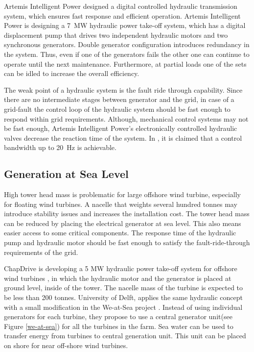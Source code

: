 \documentclass[a4paper, 11pt]{article} %
\begin{document}
Artemis Intelligent Power designed a digital controlled hydraulic transmission system, which ensures fast response and efficient operation. Artemis Intelligent Power is designing a 7~MW hydraulic power take-off system, which has a digital displacement pump that drives two independent hydraulic motors and two synchronous generators. Double generator configuration introduces redundancy in the system. Thus, even if one of the generators fails the other one can continue to operate until the next maintenance. Furthermore, at partial loads one of the sets can be idled to increase the overall efficiency.

The weak point of a hydraulic system is the fault ride through capability. Since there are no intermediate stages between generator and the grid, in case of a grid-fault the control loop of the hydraulic system should be fast enough to respond within grid requirements. Although, mechanical control systems may not be fast enough, Artemis Intelligent Power's electronically controlled hydraulic valves decrease the reaction time of the system. In \cite{artemis}, it is claimed that a control bandwidth up to 20~Hz is achievable.

\subsection{Generation at Sea Level}

High tower head mass is problematic for large offshore wind turbine, especially for floating wind turbines. A nacelle that weights several hundred tonnes may introduce stability issues and increases the installation cost. The tower head mass can be reduced by placing the electrical generator at sea level. This also means easier access to some critical components. The response time of the hydraulic pump and hydraulic motor should be fast enough to satisfy the fault-ride-through requirements of the grid.

ChapDrive is developing a 5 MW hydraulic power take-off system for offshore wind turbines \cite{Thomsen2011}, in which the hydraulic motor and the generator is placed at ground level, inside of the tower. The nacelle mass of the turbine is expected to be less than 200 tonnes. University of Delft, applies the same hydraulic concept with a small modification in the We-at-Sea project \cite{Diepeveen2004}. Instead of using individual generators for each turbine, they propose to use a central generator unit(see Figure \ref{we-at-sea}) for all the turbines in the farm. Sea water can be used to transfer energy from turbines to central generation unit. This unit can be placed on shore for near off-shore wind turbines.
\end{document}
